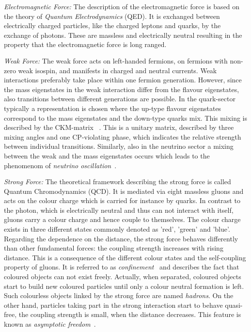 \begin{description}
\begin{description}
  \item \textit{Electromagnetic Force:} The description of the electromagnetic force is based on the theory of \textit{Quantum Electrodynamics} (QED). It is exchanged between electrically charged particles, like the charged leptons and quarks, by the exchange of photons. These are massless and electrically neutral resulting in the property that the electromagnetic force is long ranged.
  \item \textit{Weak Force:} The weak force acts on left-handed fermions, \ie on fermions with non-zero weak isospin, and manifests in charged and neutral currents. Weak interactions preferably take place within one fermion generation. However, since the mass eigenstates in the weak interaction differ from the flavour eigenstates, also transitions between different generations are possible. In the quark-sector typically a representation is chosen where the up-type flavour eigenstates correspond to the mass eigenstates and the down-type quarks mix. This mixing is described by the CKM-matrix ~\cite{PhysRevLett.10.531, PTP.49.652}. This is a unitary matrix, described by three mixing angles and one CP-violating phase, which indicates the relative strength between individual transitions. Similarly, also in the neutrino sector a mixing between the weak and the mass eigenstates occurs which leads to the phenomenom of \textit{neutrino oscillation}~\cite{Maki:1962mu, Pontecorvo:1967fh, Fukuda:1998mi}.
  \item \textit{Strong Force:} The theoretical framework describing the strong force is called Quantum Chromodynamics (QCD). It is mediated via eight massless gluons and acts on the colour charge which is carried for instance by quarks. In contrast to the photon, which is electrically neutral and thus can not interact with itself, gluons carry a colour charge and hence couple to themselves. The colour charge exists in three different states commonly denoted as 'red', 'green' and 'blue'. \\
Regarding the dependence on the distance, the strong force behaves differently than other fundamental forces: the coupling strength increases with rising distance. This is a consequence of the different colour states and the self-coupling property of gluons. It is referred to as \textit{confinement}~\cite{Alkofer:2006fu} and describes the fact that coloured objects can not exist freely. Actually, when separated, coloured objects start to build new coloured particles until only a colour neutral formation is left. Such colourless objects linked by the strong force are named \textit{hadrons}. On the other hand, particles taking part in the strong interaction start to behave quasi-free, \ie the coupling strength is small, when the distance decreases. This feature is known as \textit{asymptotic freedom}~\cite{PhysRevLett.30.1346, PhysRevLett.30.1343}. \\

\end{description}
\end{description}
